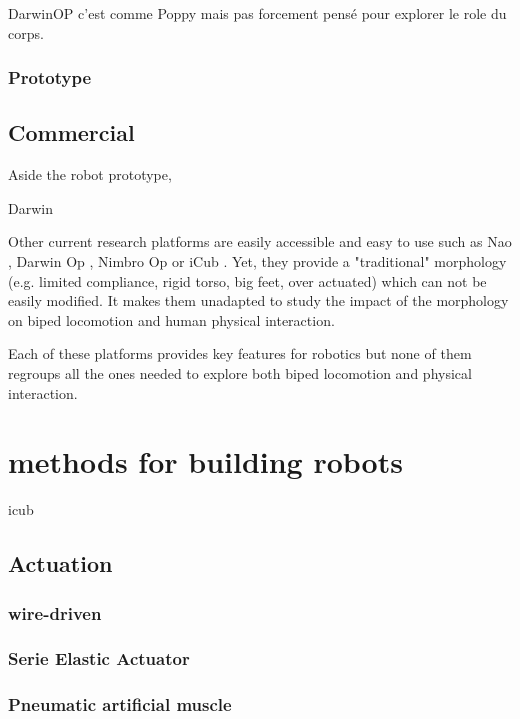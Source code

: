 DarwinOP c'est comme Poppy mais pas forcement pensé pour explorer le role du corps.

\subsubsection{Prototype} %

\subsection{Commercial} %

Aside the robot prototype,

Darwin \cite{ha2011development}

Other current research platforms are easily accessible and easy to use such as Nao \cite{gouaillier2008nao}, Darwin Op \cite{ha2011development}, Nimbro Op \cite{schwarznimbro} or iCub \cite{metta2008icub}.
Yet, they provide a "traditional" morphology (e.g.
limited compliance, rigid torso, big feet, over actuated) which can not be easily modified.
It makes them unadapted to study the impact of the morphology on biped locomotion and human physical interaction.

Each of these platforms provides key features for robotics but none of them regroups all the ones needed to explore both biped locomotion and physical interaction.

\section{methods for building robots} %
icub~\cite{tsagarakis2007icub}

\subsection{Actuation} %


\subsubsection{wire-driven} %

\subsubsection{Serie Elastic Actuator} %

\subsubsection{Pneumatic artificial muscle} %


